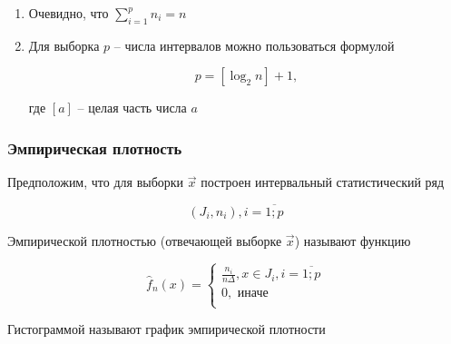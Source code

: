 \begin{note}
    \begin{enumerate}
        \item Очевидно, что $\sum_{i=1}^p n_i = n$
        \item Для выборка $p$ -- числа интервалов можно пользоваться
            формулой

            \begin{equation*}
                p = [\log_2 n] + 1,
            \end{equation*}

            где $[a]$ -- целая часть числа $a$
    \end{enumerate}
\end{note}

\subsubsection{Эмпирическая плотность}

Предположим, что для выборки $\vec x$ построен интервальный
статистический ряд

\begin{equation*}
    (J_i, n_i), i = \overline{1; p}
\end{equation*}

\begin{defenition}
    Эмпирической плотностью (отвечающей выборке $\vec x$) называют
    функцию

    \begin{equation*}
        \hat f_n(x) =
        \begin{cases}
            \frac{n_i}{n \Delta}, x \in J_i, i = \overline{1; p} \\
            0, \text{ иначе} \\
        \end{cases}
    \end{equation*}
\end{defenition}

\begin{defenition}
    Гистограммой называют график эмпирической плотности
\end{defenition}

